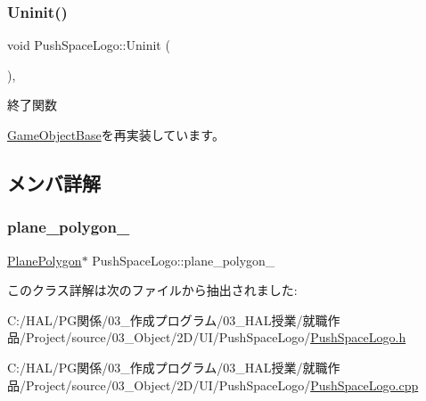 \subsubsection{\texorpdfstring{Uninit()}{Uninit()}}
{\footnotesize\ttfamily void Push\+Space\+Logo\+::\+Uninit (\begin{DoxyParamCaption}{ }\end{DoxyParamCaption})\hspace{0.3cm}{\ttfamily [override]}, {\ttfamily [virtual]}}



終了関数 



\mbox{\hyperlink{class_game_object_base_a97e1bc277d7b1c0156d4735de29a022c}{Game\+Object\+Base}}を再実装しています。



\subsection{メンバ詳解}
\mbox{\label{class_push_space_logo_ab35a4cee269c3ba0b709a8951ccc3d42}} 
\subsubsection{\texorpdfstring{plane\+\_\+polygon\+\_\+}{plane\_polygon\_}}
{\footnotesize\ttfamily \mbox{\hyperlink{class_plane_polygon}{Plane\+Polygon}}$\ast$ Push\+Space\+Logo\+::plane\+\_\+polygon\+\_\+}



このクラス詳解は次のファイルから抽出されました\+:\begin{DoxyCompactItemize}
\item 
C\+:/\+H\+A\+L/\+P\+G関係/03\+\_\+作成プログラム/03\+\_\+\+H\+A\+L授業/就職作品/\+Project/source/03\+\_\+\+Object/2\+D/\+U\+I/\+Push\+Space\+Logo/\mbox{\hyperlink{_push_space_logo_8h}{Push\+Space\+Logo.\+h}}\item 
C\+:/\+H\+A\+L/\+P\+G関係/03\+\_\+作成プログラム/03\+\_\+\+H\+A\+L授業/就職作品/\+Project/source/03\+\_\+\+Object/2\+D/\+U\+I/\+Push\+Space\+Logo/\mbox{\hyperlink{_push_space_logo_8cpp}{Push\+Space\+Logo.\+cpp}}\end{DoxyCompactItemize}
